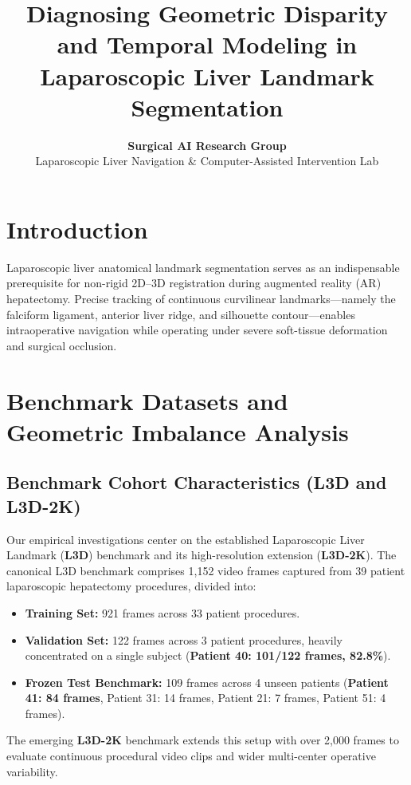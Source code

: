 \documentclass{article}
\title{\textbf{Diagnosing Geometric Disparity and Temporal Modeling in Laparoscopic Liver Landmark Segmentation}}
\author{
    \textbf{Surgical AI Research Group} \\
    Laparoscopic Liver Navigation \& Computer-Assisted Intervention Lab
}
\begin{document}
\maketitle

\section{Introduction}

Laparoscopic liver anatomical landmark segmentation serves as an indispensable prerequisite for non-rigid 2D--3D registration during augmented reality (AR) hepatectomy. Precise tracking of continuous curvilinear landmarks---namely the falciform ligament, anterior liver ridge, and silhouette contour---enables intraoperative navigation while operating under severe soft-tissue deformation and surgical occlusion.

\section{Benchmark Datasets and Geometric Imbalance Analysis}

\subsection{Benchmark Cohort Characteristics (L3D and L3D-2K)}
Our empirical investigations center on the established Laparoscopic Liver Landmark (\textbf{L3D}) benchmark and its high-resolution extension (\textbf{L3D-2K}). 
The canonical L3D benchmark comprises 1,152 video frames captured from 39 patient laparoscopic hepatectomy procedures, divided into:
\begin{itemize}[leftmargin=18pt, topsep=2pt, itemsep=1pt]
    \item \textbf{Training Set:} 921 frames across 33 patient procedures.
    \item \textbf{Validation Set:} 122 frames across 3 patient procedures, heavily concentrated on a single subject (\textbf{Patient 40: 101/122 frames, 82.8\%}).
    \item \textbf{Frozen Test Benchmark:} 109 frames across 4 unseen patients (\textbf{Patient 41: 84 frames}, Patient 31: 14 frames, Patient 21: 7 frames, Patient 51: 4 frames).
\end{itemize}
The emerging \textbf{L3D-2K} benchmark extends this setup with over 2,000 frames to evaluate continuous procedural video clips and wider multi-center operative variability.
\end{document}
